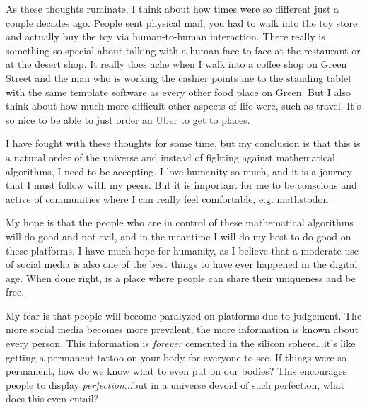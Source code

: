 \documentclass[12pt]{article}
\theoremstyle{definition} %
\theoremstyle{plain} %
\begin{document}
As these thoughts ruminate, I think about how times were so different just a couple decades ago. People sent physical mail, you had to walk into the toy store and actually buy the toy via human-to-human interaction. There really is something so special about talking with a human face-to-face at the restaurant or at the desert shop. It really does ache when I walk into a coffee shop on Green Street and the man who is working the cashier points me to the standing tablet with the same template software as every other food place on Green. But I also think about how much more difficult other aspects of life were, such as travel. It's so nice to be able to just order an Uber to get to places. 
\vspace{.5cm} 

I have fought with these thoughts for some time, but my conclusion is that this is a natural order of the universe and instead of fighting against mathematical algorithms, I need to be accepting. I love humanity so much, and it is a journey that I must follow with my peers. But it is important for me to be conscious and active of communities where I can really feel comfortable, e.g. mathstodon. 
\vspace{.5cm} 

My hope is that the people who are in control of these mathematical algorithms will do good and not evil, and in the meantime I will do my best to do good on these platforms. I have much hope for humanity, as I believe that a moderate use of social media is also one of the best things to have ever happened in the digital age. When done right, is a place where people can share their uniqueness and be free. 
\vspace{.5cm} 

My fear is that people will become paralyzed on platforms due to judgement. The more social media becomes more prevalent, the more information is known about every person. This information is \emph{forever} cemented in the silicon sphere...it's like getting a permanent tattoo on your body for everyone to see. If things were so permanent, how do we know what to even put on our bodies? This encourages people to display \emph{perfection}...but in a universe devoid of such perfection, what does this even entail?
\end{document}
